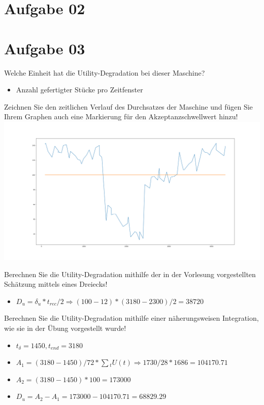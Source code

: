 \documentclass{ocbeameruni}
\begin{document}
\section{Aufgabe 02}


\section{Aufgabe 03}

\begin{frame}{3.1}
Welche Einheit hat die Utility-Degradation bei dieser Maschine?
    \begin{itemize}
    \item Anzahl gefertigter Stücke pro Zeitfenster
    \end{itemize}
\end{frame}

\begin{frame}{3.2}
    \begin{center}
Zeichnen Sie den zeitlichen Verlauf des Durchsatzes der Maschine und fügen Sie Ihrem Graphen
auch eine Markierung für den Akzeptanzschwellwert hinzu!
    \includegraphics[scale=0.16]{oc_3-2.png}
    \end{center}
\end{frame}

\begin{frame}{3.3}
Berechnen Sie die Utility-Degradation mithilfe der in der Vorlesung vorgestellten Schätzung
mittels eines Dreiecks!
    \begin{itemize}
    \item $D_u = \delta{_u} * t_{rec} / 2 \Rightarrow (100-12) * (3180-2300) / 2 = 38720$
    \end{itemize}
\end{frame}

\begin{frame}{3.4}
Berechnen Sie die Utility-Degradation mithilfe einer näherungsweisen Integration, wie sie in
der Übung vorgestellt wurde!
    \begin{itemize}
    \item $t_{\delta} = 1450, t_{end} = 3180$
    \item $A_1 = (3180-1450)/72 * \sum{_t} U(t) \Rightarrow 1730/28 * 1686 = 104170.71$
    \item $A_2 = (3180-1450)*100 = 173000$
    \item $D_u = A_2 - A_1 = 173000 - 104170.71 = 68829.29$
    \end{itemize}
\end{frame}
\end{document}
